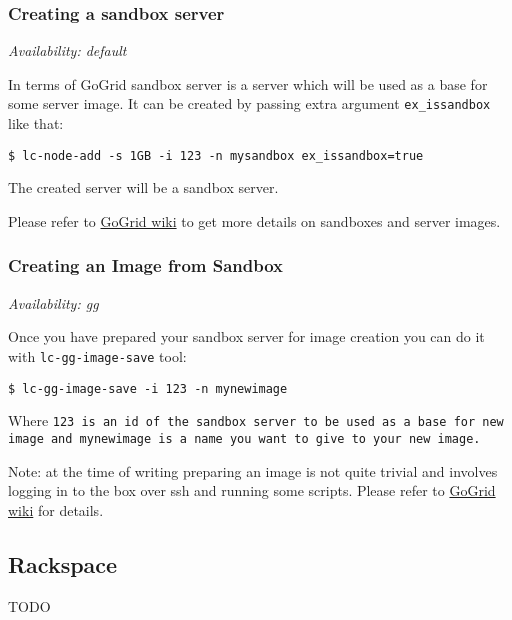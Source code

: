 \documentclass[a4paper]{report}
\begin{document}
\subsubsection{Creating a sandbox server}

\textit{Availability: default}

In terms of GoGrid sandbox server is a server which will be used as a base for
some server image. It can be created by passing extra argument {\tt ex\_issandbox}
like that:

\begin{verbatim}
$ lc-node-add -s 1GB -i 123 -n mysandbox ex_issandbox=true
\end{verbatim}


The created server will be a sandbox server.


Please refer to \href{http://wiki.gogrid.com/wiki/index.php/MyGSI}{GoGrid wiki} to get
more details on sandboxes and server images.

\subsubsection{Creating an Image from Sandbox}

\textit{Availability: gg}

Once you have prepared your sandbox server for image creation you can do it with 
\texttt{lc-gg-image-save} tool:

\begin{verbatim}
$ lc-gg-image-save -i 123 -n mynewimage
\end{verbatim}

Where \tt{123} is an id of the sandbox server to be used as a base for new image and
\tt{mynewimage} is a name you want to give to your new image.

Note: at the time of writing preparing an image is not quite trivial and involves logging in
to the box over ssh and running some scripts. Please refer to 
\href{http://wiki.gogrid.com/wiki/index.php/MyGSI}{GoGrid wiki} for details.

\subsection{Rackspace}
TODO
\end{document}
